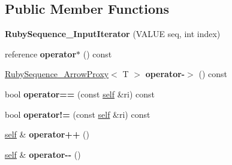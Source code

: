 \subsection*{Public Member Functions}
\begin{DoxyCompactItemize}
\item 
{\bfseries Ruby\+Sequence\+\_\+\+Input\+Iterator} (V\+A\+L\+UE seq, int index)\hypertarget{structswig_1_1RubySequence__InputIterator_a9c10c529089847aad34dc877207adbf7}{}\label{structswig_1_1RubySequence__InputIterator_a9c10c529089847aad34dc877207adbf7}

\item 
reference {\bfseries operator$\ast$} () const \hypertarget{structswig_1_1RubySequence__InputIterator_aa364422c39b974b7b7cede869e57f125}{}\label{structswig_1_1RubySequence__InputIterator_aa364422c39b974b7b7cede869e57f125}

\item 
\hyperlink{structswig_1_1RubySequence__ArrowProxy}{Ruby\+Sequence\+\_\+\+Arrow\+Proxy}$<$ T $>$ {\bfseries operator-\/$>$} () const \hypertarget{structswig_1_1RubySequence__InputIterator_a64c346913dd973c597f6e469879b6681}{}\label{structswig_1_1RubySequence__InputIterator_a64c346913dd973c597f6e469879b6681}

\item 
bool {\bfseries operator==} (const \hyperlink{structswig_1_1RubySequence__InputIterator}{self} \&ri) const \hypertarget{structswig_1_1RubySequence__InputIterator_ab09a9a05399e22d1f1ee7988cf928360}{}\label{structswig_1_1RubySequence__InputIterator_ab09a9a05399e22d1f1ee7988cf928360}

\item 
bool {\bfseries operator!=} (const \hyperlink{structswig_1_1RubySequence__InputIterator}{self} \&ri) const \hypertarget{structswig_1_1RubySequence__InputIterator_ac241ecb5d5235050408bffd97d1baf22}{}\label{structswig_1_1RubySequence__InputIterator_ac241ecb5d5235050408bffd97d1baf22}

\item 
\hyperlink{structswig_1_1RubySequence__InputIterator}{self} \& {\bfseries operator++} ()\hypertarget{structswig_1_1RubySequence__InputIterator_aa9abb3e891907a386a617ef620711622}{}\label{structswig_1_1RubySequence__InputIterator_aa9abb3e891907a386a617ef620711622}

\item 
\hyperlink{structswig_1_1RubySequence__InputIterator}{self} \& {\bfseries operator-\/-\/} ()\hypertarget{structswig_1_1RubySequence__InputIterator_a13e3e4f987100243ec57574ccde3a3dc}{}\label{structswig_1_1RubySequence__InputIterator_a13e3e4f987100243ec57574ccde3a3dc}


\end{DoxyCompactItemize}
